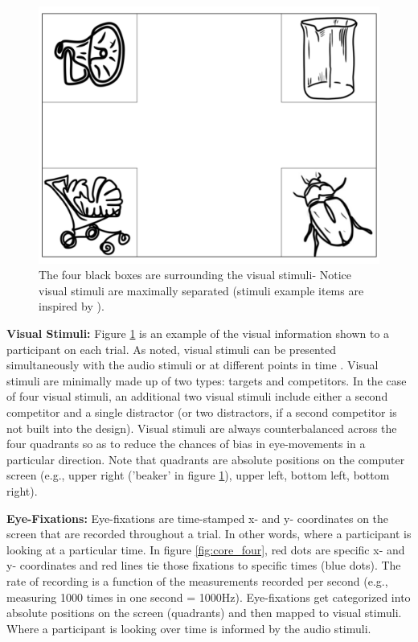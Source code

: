 \begin{figure}[h]
    \centering
    \includegraphics[scale=.35]{figures/Visual_stimuli.png}
    \caption{The four black boxes are surrounding the visual stimuli- Notice visual stimuli are maximally separated (stimuli example items are inspired by \textcite[][]{Allopenna_1998}{}{}). }
    \label{fig:Visual_stimuli.png}
\end{figure}

\textbf{Visual Stimuli:} Figure \ref{fig:Visual_stimuli.png} is an example of the visual information shown to a participant on each trial. As noted, visual stimuli can be presented simultaneously with the audio stimuli or at different points in time  \parencite{Apfelbaum_Klein-Packard_McMurray_2021}. Visual stimuli are minimally made up of two types: targets and competitors. In the case of four visual stimuli, an additional two visual stimuli include either a second competitor and a single distractor (or two distractors, if a second competitor is not built into the design). Visual stimuli are always counterbalanced across the four quadrants so as to reduce the chances of bias in eye-movements in a particular direction. Note that quadrants are absolute positions on the computer screen (e.g., upper right ('beaker' in figure \ref{fig:Visual_stimuli.png}), upper left, bottom left, bottom right). 

\textbf{Eye-Fixations:} Eye-fixations are time-stamped x- and y- coordinates on the screen that are recorded throughout a trial. In other words, where a participant is looking at a particular time. In figure \ref{fig:core_four}, red dots are specific x- and y- coordinates and red lines tie those fixations to specific times (blue dots). The rate of recording is a function of the measurements recorded per second (e.g., measuring 1000 times in one second = 1000Hz). Eye-fixations get categorized into absolute positions on the screen (quadrants) and then mapped to visual stimuli. Where a participant is looking over time is informed by the audio stimuli.

